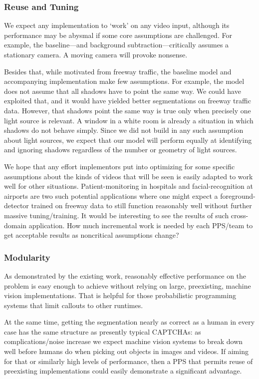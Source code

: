 \subsubsection{Reuse and Tuning}

We expect any implementation to `work' on any video input, although
its performance may be abysmal if some core assumptions are
challenged.  For example, the baseline---and background
subtraction---critically assumes a stationary camera.  A moving camera
will provoke nonsense.

Besides that, while motivated from freeway
traffic, the baseline model and accompanying implementation  make few assumptions.
For example, the model does not assume that all shadows have to point
the same way.  We could have exploited that, and it would have yielded
better segmentations on freeway traffic data.  However, that shadows point the same way is
true only when precisely one light source is relevant.  A window in a
white room is already a situation in which shadows do not behave
simply.  Since we did not build in any such assumption about light
sources, we expect that our model will perform equally at
identifying and ignoring shadows regardless of the number or geometry of light sources.

We hope that
any effort implementors put into optimizing for some specific
assumptions about the kinds of videos that will be seen is easily
adapted to work well for other situations.  Patient-monitoring in
hospitals and facial-recognition at airports are two such potential applications
where one might expect a foreground-detector trained on freeway data
to still function reasonably well without further massive tuning/training.
It would be interesting to see the results of such cross-domain
application.  How much incremental work is needed by each PPS/team to get
acceptable results as noncritical assumptions change?


\subsubsection{Modularity}

As demonstrated by the existing work,
reasonably effective performance on the problem is easy enough to
achieve without relying on large, preexisting, machine vision
implementations.  That is helpful for those probabilistic programming
systems that limit callouts to other runtimes.

At the same time, getting the segmentation nearly as correct as a
human in every case has the same structure as presently typical
CAPTCHAs: as complications/noise increase we expect machine vision
systems to break down well before humans do when picking out
objects in images and videos.  If aiming for that or similarly high
levels of performance, then a PPS that permits reuse of
preexisting implementations could easily demonstrate a significant
advantage.


